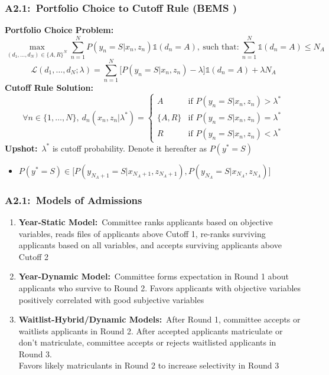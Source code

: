 \documentclass[12pt, aspectratio=169]{beamer}
\begin{document}
\begin{frame}[label=pctcr]
\frametitle{A2.1:\ Portfolio Choice to Cutoff Rule (BEMS \citeyear{bai2022})}
\textbf{Portfolio Choice Problem:}
\begin{equation*}
\max_{(d_1,\dots,d_N)\in\{A,R\}^N} \sum_{n=1}^NP(y_n=S|x_n,z_n)\mathds1(d_n=A), \: \text{such that:} \: \sum_{n=1}^N\mathds1(d_n=A)\leq N_A
\end{equation*}
\begin{equation*}
\mathcal L(d_1,\dots,d_N;\lambda) = \sum_{n=1}^N\big[P(y_n=S|x_n,z_n)-\lambda\big]\mathds1(d_n=A)+\lambda N_A
\end{equation*}
\textbf{Cutoff Rule Solution:}
\vspace{-7.5pt}
\begin{equation*}
\forall n\in\{1,\dots,N\}, \: d_n(x_n,z_n|\lambda^*)=\begin{cases}
A & \text{if } P(y_n=S|x_n,z_n)>\lambda^* \\
\{A,R\} & \text{if } P(y_n=S|x_n,z_n)=\lambda^* \\
R & \text{if } P(y_n=S|x_n,z_n)<\lambda^*
\end{cases}
\end{equation*}
\textbf{Upshot:}\ $\lambda^*$ is cutoff probability. Denote it hereafter as $P(y^*=S)$
\vspace{2.5pt}
\begin{itemize}
\item $P(y^*=S)\in\big[P(y_{N_A+1}=S|x_{N_A+1},z_{N_A+1}),P(y_{N_A}=S|x_{N_A},z_{N_A})\big]$
\end{itemize}
\hyperlink{mf}{}
\end{frame}

\begin{frame}[label=moa]
\frametitle{A2.1:\ Models of Admissions}
\begin{enumerate}
\item \textbf{Year-Static Model:}\ Committee ranks applicants based on objective variables, reads files of applicants above Cutoff 1, re-ranks surviving applicants based on all variables, and accepts surviving applicants above Cutoff 2
\vspace{10pt}
\item \textbf{Year-Dynamic Model:}\ Committee forms expectation in Round 1 about applicants who survive to Round 2. Favors applicants with objective variables positively correlated with good subjective variables
\vspace{10pt}
\item \textbf{Waitlist-Hybrid/Dynamic Models:}\ After Round 1, committee accepts or waitlists applicants in Round 2. After accepted applicants matriculate or don't matriculate, committee accepts or rejects waitlisted applicants in Round 3. \\ Favors likely matriculants in Round 2 to increase selectivity in Round 3
\vspace{10pt}
\end{enumerate}
\hyperlink{crp}{}
\end{frame}
\end{document}
